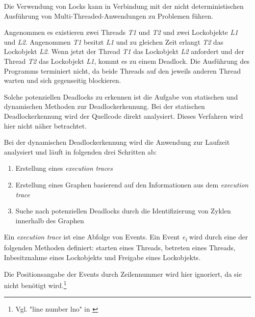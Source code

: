 Die Verwendung von Locks kann in Verbindung mit der nicht deterministischen
Ausführung von Multi-Threaded-Anwendungen zu Problemen führen.

Angenommen es existieren zwei Threads \emph{T1} und \emph{T2} und zwei
Lockobjekte \emph{L1} und \emph{L2}. Angenommen \emph{T1} besitzt \emph{L1} und
zu gleichen Zeit erlangt \emph{T2} das Lockobjekt \emph{L2}. Wenn jetzt der
Thread \emph{T1} das Lockobjekt \emph{L2} anfordert und der Thread \emph{T2} das
Lockobjekt \emph{L1}, kommt es zu einem
Deadlock.\autocite[vgl.][70]{coffman1971system} Die Ausführung des Programms
terminiert nicht, da beide Threads auf den jeweils anderen Thread warten und
sich gegenseitig blockieren.

Solche potenziellen Deadlocks zu erkennen ist die Aufgabe von statischen und
dynamischen Methoden zur Deadlockerkennung. Bei der statischen Deadlockerkennung
wird der Quellcode direkt analysiert. Dieses Verfahren wird hier nicht näher
betrachtet.

Bei der dynamischen Deadlockerkennung wird die Anwendung zur Laufzeit analysiert
und läuft in folgenden drei Schritten
ab:\autocite[vgl.][212-213]{bensalem2005dynamic}
\begin{enumerate}
  \item Erstellung eines \emph{execution traces}
  \item Erstellung eines Graphen basierend auf den Informationen aus dem \emph{execution trace}
  \item Suche nach potenziellen Deadlocks durch die Identifizierung von Zyklen
  innerhalb des Graphen
\end{enumerate}
Ein \emph{execution trace} ist eine Abfolge von Events. Ein Event
\emph{e\textsubscript{i}} wird durch eine der folgenden Methoden definiert:
starten eines Threads, betreten eines Threads, Inbesitznahme eines Lockobjekts
und Freigabe eines Lockobjekts.\autocite[vgl.][212]{bensalem2005dynamic}

Die Positionsangabe der Events durch Zeilennummer wird hier ignoriert, da sie
nicht benötigt wird.\footnote{Vgl. "line number lno" in
\autocite[212]{bensalem2005dynamic}}

